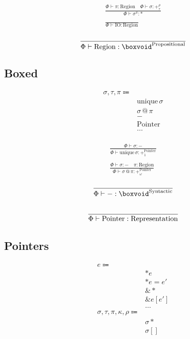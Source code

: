 \documentclass {article}
\begin{document}
\begin{gather*}
\frac
{\Phi \vdash \pi : \text{Region} \quad \Phi \vdash \sigma : +^\rho_\tau}
{\Phi \vdash \sigma^\pi : *} \\
\\
\frac
{}
{\Phi \vdash \text{IO} : \text{Region}}
\end{gather*}

\begin{gather*}
\frac
{}
{\Phi \vdash \text{Region} : \boxvoid^\text{Propositional}} \\
\end{gather*}

\subsection{Boxed}
\begin{align*}
\sigma, \tau, \pi \Coloneqq & \\
& \text{unique} \, \sigma \\
& \sigma \, @ \, \pi \\
& - \tag{Boxed} \\
& \text{Pointer} \tag{Pointer Representation} \\
& \dots \\
\end{align*}

\begin{gather*}
\frac
{\Phi \vdash \sigma : -}
{\Phi \vdash \text{unique} \, \sigma : +^\text{Pointer}_1} \\
\\
\frac
{\Phi \vdash \sigma : - \quad \pi : \text{Region}}
{\Phi \vdash \sigma \, @ \, \pi : +^\text{Pointer}_\omega} 
\end{gather*}

\begin{gather*}
\frac
{}
{\Phi \vdash - : \boxvoid^\text{Syntactic}} \\
\\
\frac
{}
{\Phi \vdash \text{Pointer} : \text{Representation}} \\
\end{gather*}

\subsection{Pointers}
\begin{align*}
e \Coloneqq & \\
& *e \tag{Read Pointer} \\
& *e = e' \tag{Write Pointer} \\
& \& * \tag{Array to Pointer} \\
& \& e [e'] \tag{Array Increment} \\
& \dots \\
\sigma, \tau, \pi, \kappa, \rho \Coloneqq & \\
& \sigma* \tag{Pointer} \\
& \sigma[] \tag{Array Pointer} \\
\end{align*}
\end{document}

